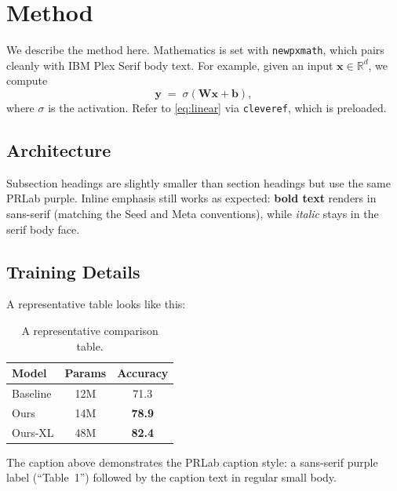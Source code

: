 \section{Method}
\label{sec:method}

We describe the method here. Mathematics is set with \texttt{newpxmath}, which
pairs cleanly with IBM Plex Serif body text. For example, given an input
$\mathbf{x} \in \mathbb{R}^d$, we compute
\begin{equation}
  \mathbf{y} \;=\; \sigma(\mathbf{W}\mathbf{x} + \mathbf{b}),
  \label{eq:linear}
\end{equation}
where $\sigma$ is the activation. Refer to \cref{eq:linear} via
\texttt{cleveref}, which is preloaded.

\subsection{Architecture}
\label{sec:arch}

Subsection headings are slightly smaller than section headings but use the
same PRLab purple. Inline emphasis still works as expected:
\textbf{bold text} renders in sans-serif (matching the Seed and Meta
conventions), while \emph{italic} stays in the serif body face.

\subsection{Training Details}
\label{sec:train}

A representative table looks like this:

\begin{table}[h]
  \centering
  \begin{tabular}{lcc}
    \toprule
    \textbf{Model} & \textbf{Params} & \textbf{Accuracy} \\
    \midrule
    Baseline & 12M  & 71.3 \\
    Ours     & 14M  & \textbf{78.9} \\
    Ours-XL  & 48M  & \textbf{82.4} \\
    \bottomrule
  \end{tabular}
  \caption{A representative comparison table.\label{tab:main}}
\end{table}

The caption above demonstrates the PRLab caption style: a sans-serif purple
label (``Table~1'') followed by the caption text in regular small body.
